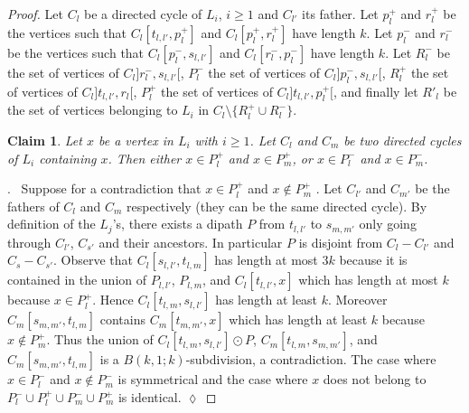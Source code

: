 \documentclass[utf8,10pt]{article}
\theoremstyle{plain}
\newtheorem{claim}{Claim}[theorem]
\theoremstyle{definition}
\theoremstyle{remark}
\newenvironment{subproof}{\par\noindent {\it Subproof}.\ }{\hfill$\lozenge$\par\vspace{11pt}}
\begin{document}
\begin{proof}
Let $C_l$ be a directed cycle of $L_i$, $i \geq 1$ and $C_{l'}$ its father. 
Let $p^+_l$ and $r^+_l$ be the vertices such that $C_l[t_{l,l'}, p^+_l]$ and $C_l[p^+_l,r^+_l]$  have length $k$. 
Let $p^-_l$ and $r^-_l$ be the vertices such that $C_l[p^-_l,s_{l,l'}]$ and $C_l[r^-_l,p^-_l]$ have length $k$.
Let $R^-_l$ be the set of vertices of $C_l]r^-_l, s_{l,l'}[$, $P^-_l$ the set of vertices of $C_l]p^-_l, s_{l,l'}[$,
$R^+_l$ the set of vertices of $C_l ]t_{l,l'}, r_l[$, $P^+_l$ the set of vertices of $C_l ]t_{l,l'}, p^+_l[$, and finally let 
$R'_l$ be the set of vertices belonging to $L_i$ in $C_l \setminus \{ R^+_l \cup R^-_l \}$. 



\begin{claim}\label{claim:Rpos}
Let $x$ be a vertex in $L_i$ with $i\geq 1$. Let $C_l$ and $C_m$ be two directed cycles of $L_i$ containing $x$.
Then either $x \in P^+_l$ and  $x \in  P^+_m$, or $x \in P^-_l$ and  $x \in  P^-_m$.
\end{claim}

\begin{subproof}
Suppose for a contradiction that $x\in P^+_l$ and $x \not \in  P^+_m$  . %
Let $C_{l'}$ and $C_{m'}$ be the fathers of $C_l$ and $C_m$ respectively (they can be the same directed cycle). 
By definition of the $L_j$'s,  there exists a dipath $P$ from $t_{l,l'}$ to $s_{m,m'}$ only going through 
$C_{l'}$, $C_{s'}$ and their ancestors.
In particular $P$ is disjoint from $C_l - C_{l'}$ and  $C_s - C_{s'}$.
Observe that $C_l[s_{l,l'},t_{l,m}]$ has length at most $3k$ because it is contained in the union of $P_{l,l'}$, $P_{l,m}$, and $C_l[t_{l,l'}, x]$ which has length at most $k$ because $x\in P^+_l$. Hence  $C_l[t_{l,m},s_{l,l'}]$ has length at least $k$.
Moreover $C_m[s_{m,m'},t_{l,m}]$ contains  $C_m[t_{m,m'}, x]$ which has length at least $k$ because $x\notin P^+_m$.
Thus the union of $C_l[t_{l,m},s_{l,l'}] \odot P$, $C_m[t_{l,m},s_{m,m'}]$, 
and  $C_m[s_{m,m'},t_{l,m}]$ is a $B(k,1;k)$-subdivision, a contradiction.
The case where  $x\in P^-_l$ and $x \not \in  P^-_m$ is symmetrical and the case where $x$ does not belong to $P^-_l \cup P^+_l \cup P^-_m \cup P^+_m$ is identical.
\end{subproof}




\end{proof}
\end{document}
